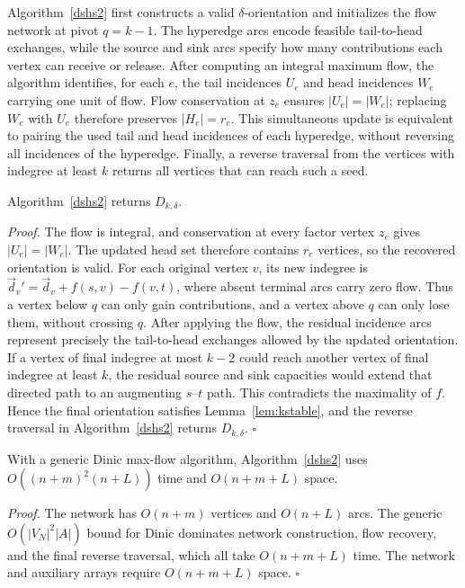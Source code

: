 \documentclass[twocolumn]{svjour3}
\newcommand{\kw}[1]{{\ensuremath{\mathsf{#1}}}\xspace}
\begin{document}
Algorithm~\ref{dshs2} first constructs a valid $\delta$-orientation
and initializes the flow network at pivot $q=k-1$.
The hyperedge arcs encode feasible tail-to-head exchanges, while the
source and sink arcs specify how many contributions each vertex can
receive or release. After computing an integral maximum flow, the
algorithm identifies, for each $e$, the tail incidences $U_e$ and
head incidences $W_e$ carrying one unit of flow.
Flow conservation at $z_e$ ensures $|U_e|=|W_e|$; replacing $W_e$
with $U_e$ therefore preserves $|H_e|=r_e$.
This simultaneous update is equivalent to pairing the used tail and
head incidences of each hyperedge, without reversing all incidences of
the hyperedge. Finally, a reverse traversal from the vertices with
indegree at least $k$ returns all vertices that can reach such a seed.

\begin{theorem}[Correctness of $\kw{DSM\text{-}FLOW}$]\label{comflowcorr}
Algorithm~\ref{dshs2} returns $D_{k,\delta}$.
\end{theorem}
\emph{Proof.}
The flow is integral, and conservation at every factor vertex
$z_e$ gives $|U_e|=|W_e|$. The updated head set therefore contains
$r_e$ vertices, so the recovered orientation is valid.
For each original vertex $v$, its new indegree is
$\vec d_v'=\vec d_v+f(s,v)-f(v,t)$, where absent terminal arcs
carry zero flow. Thus a vertex below $q$ can only gain contributions,
and a vertex above $q$ can only lose them, without crossing $q$.
After applying the flow, the residual incidence arcs represent
precisely the tail-to-head exchanges allowed by the updated
orientation. If a vertex of final indegree at most $k-2$ could reach
another vertex of final indegree at least $k$, the residual source and
sink capacities would extend that directed path to an augmenting
$s$--$t$ path. This contradicts the maximality of $f$.
Hence the final orientation satisfies Lemma~\ref{lem:kstable},
and the reverse traversal in Algorithm~\ref{dshs2} returns
$D_{k,\delta}$.
\hfill$\square$

\begin{theorem}\label{comflow}
With a generic Dinic max-flow algorithm, Algorithm~\ref{dshs2}
uses $O((n+m)^2(n+L))$ time and $O(n+m+L)$ space.
\end{theorem}
\emph{Proof.}
The network has $O(n+m)$ vertices and $O(n+L)$ arcs. The generic
$O(|V_N|^2|A|)$ bound for Dinic dominates network construction,
flow recovery, and the final reverse traversal, which all take
$O(n+m+L)$ time. The network and auxiliary arrays require
$O(n+m+L)$ space.
\hfill$\square$
\end{document}
